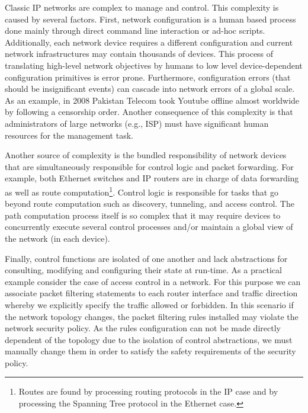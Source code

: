 Classic IP networks are complex to manage and control. This complexity is caused by several factors. First, network configuration is a human based process done mainly through direct command line interaction or ad-hoc scripts. Additionally, each network device requires a different configuration and current network infrastructures may contain thousands of devices. This process of translating high-level network objectives by humans to low level device-dependent configuration primitives is error prone. Furthermore, configuration errors (that should be insignificant events) can cascade into network errors of a global scale. As an example, in 2008 Pakistan Telecom took Youtube offline almost worldwide \cite{McCullagh:2008fk} by following a censorship order. Another consequence of this complexity is that administrators of large networks (e.g., ISP)  must have significant human resources for the management task.  

Another source of complexity is the bundled responsibility  of network devices that are simultaneously responsible for control logic and packet forwarding. For example, both Ethernet  switches and IP routers are in charge of  data forwarding as well as route computation\footnote{Routes are found by processing routing protocols in the IP case and by processing the Spanning Tree protocol in the Ethernet case.}. Control logic is responsible for  tasks that go beyond route computation such as  discovery, tunneling, and  access control. The path computation process itself is so complex that it may require devices to concurrently execute several control processes and/or maintain a global view of the network (in each device).  

Finally, control functions are isolated of one another and lack
abstractions for consulting, modifying and configuring their state at
run-time. As a practical example consider the case of access control
in a network. For this purpose we can associate packet filtering
statements to each router interface and traffic direction whereby we
explicitly specify the traffic allowed or forbidden. In this scenario
if the network topology changes, the packet filtering rules installed
may violate  the network security policy. As the rules configuration
can not be made directly dependent of the topology due to the
isolation of control abstractions, we must manually change them in
order to satisfy the safety requirements of the security policy.  
